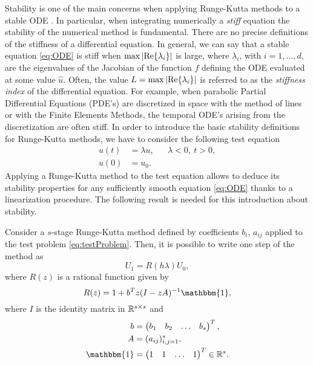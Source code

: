 Stability is one of the main concerns when applying Runge-Kutta methods to a stable ODE \cite{HaW96}. In particular, when integrating numerically a \textit{stiff} equation the stability of the numerical method is fundamental. There are no precise definitions of the stiffness of a differential equation. In general, we can say that a stable equation \eqref{eq:ODE} is stiff when $\max \abs{\Re{\lambda_i}}$ is large, where $\lambda_i$, with $i = 1, \ldots, d$, are the eigenvalues of the Jacobian of the function $f$ defining the ODE evaluated at some value $\hat u$. Often, the value $L = \max \abs{\Re{\lambda_i}}$ is referred to as the \textit{stiffness index} of the differential equation. For example, when parabolic Partial Differential Equations (PDE's) are discretized in space with the method of lines or with the Finite Elements Methods, the temporal ODE's arising from the discretization are often stiff. In order to introduce the basic stability definitions for Runge-Kutta methods, we have to consider the following test equation
\begin{equation}\label{eq:testProblem}
\begin{aligned}
	u(t) &= \lambda u, && \lambda < 0, \: t > 0,\\
	u(0) &= u_0.
\end{aligned}
\end{equation}
Applying a Runge-Kutta method to the test equation allows to deduce its stability properties for any sufficiently smooth equation \eqref{eq:ODE} thanks to a linearization procedure. The following result is needed for this introduction about stability. 
\begin{theorem} Consider a $s$-stage Runge-Kutta method defined by coefficients $b_i$, $a_{ij}$ applied to the test problem \eqref{eq:testProblem}. Then, it is possible to write one step of the method as
\begin{equation}
	U_1 = R(h\lambda) U_0,
\end{equation}
where $R(z)$ is a rational function given by
\begin{equation}
	R(z) = 1 + b^Tz(I - zA)^{-1} \mathbbm{1},
\end{equation}
where $I$ is the identity matrix in $\mathbb{R}^{s\times s}$ and 
\begin{equation}
\begin{aligned}
	b &= \begin{pmatrix}b_1& b_2& \ldots & b_s\end{pmatrix}^T, \\
	A &= (a_{ij})_{i,j = 1}^s, \\
	\mathbbm{1} &= \begin{pmatrix} 1 & 1 & \ldots & 1 \end{pmatrix}^T \in \R^s.
\end{aligned}
\end{equation}
\end{theorem}
